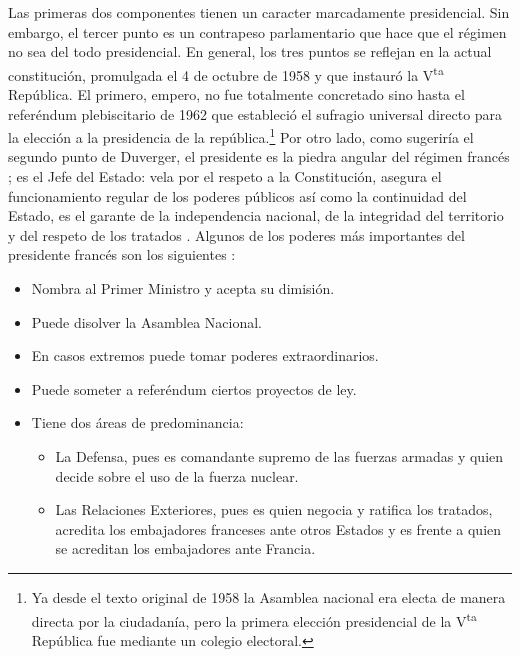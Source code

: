 Las primeras dos componentes tienen un caracter marcadamente presidencial. Sin embargo, el tercer punto es un contrapeso parlamentario que hace que el régimen no sea del todo presidencial. En general, los tres puntos se reflejan en la actual constitución, promulgada el 4 de octubre de 1958 y que instauró la V\textsuperscript{ta} República. El primero, empero, no fue totalmente concretado sino hasta el referéndum plebiscitario de 1962 que estableció el sufragio universal directo para la elección a la presidencia de la república.\footnote{Ya desde el texto original de 1958 la Asamblea nacional era electa de manera directa por la ciudadanía, pero la primera elección presidencial de la V\textsuperscript{ta} República fue mediante un colegio electoral.} Por otro lado, como sugeriría el segundo punto de Duverger, el presidente es la piedra angular del régimen francés \parencite[secc. III]{AN17a}; es el Jefe del Estado: vela por el respeto a la Constitución, asegura el funcionamiento regular de los poderes públicos así como la continuidad del Estado, es el garante de la independencia nacional, de la integridad del territorio y del respeto de los tratados \parencite[art. V]{ConstFr}. Algunos de los poderes más importantes del presidente francés son los siguientes \parencites[secc. III]{AN17a}{ViePublique}: 

\begin{itemize}
\item Nombra al Primer Ministro y acepta su dimisión. 
\item Puede disolver la Asamblea Nacional. 
\item En casos extremos puede tomar poderes extraordinarios. 
\item Puede someter a referéndum ciertos proyectos de ley. 
\item Tiene dos áreas de predominancia: 
		\begin{itemize}
		\item La Defensa, pues es comandante supremo de las fuerzas armadas y quien decide sobre el uso de la fuerza nuclear. 
		\item Las Relaciones Exteriores, pues es quien negocia y ratifica los tratados, acredita los embajadores franceses ante otros Estados y es frente a quien se acreditan los embajadores ante Francia.
		\end{itemize}
\end{itemize}

